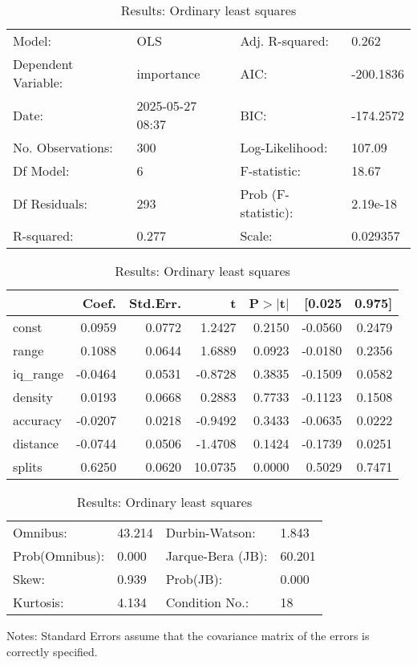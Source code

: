 \begin{table}
\caption{Results: Ordinary least squares}
\label{}
\begin{center}
\begin{tabular}{llll}
\hline
Model:              & OLS              & Adj. R-squared:     & 0.262      \\
Dependent Variable: & importance       & AIC:                & -200.1836  \\
Date:               & 2025-05-27 08:37 & BIC:                & -174.2572  \\
No. Observations:   & 300              & Log-Likelihood:     & 107.09     \\
Df Model:           & 6                & F-statistic:        & 18.67      \\
Df Residuals:       & 293              & Prob (F-statistic): & 2.19e-18   \\
R-squared:          & 0.277            & Scale:              & 0.029357   \\
\hline
\end{tabular}
\end{center}

\begin{center}
\begin{tabular}{lrrrrrr}
\hline
          &   Coef. & Std.Err. &       t & P$> |$t$|$ &  [0.025 & 0.975]  \\
\hline
const     &  0.0959 &   0.0772 &  1.2427 &      0.2150 & -0.0560 & 0.2479  \\
range     &  0.1088 &   0.0644 &  1.6889 &      0.0923 & -0.0180 & 0.2356  \\
iq\_range & -0.0464 &   0.0531 & -0.8728 &      0.3835 & -0.1509 & 0.0582  \\
density   &  0.0193 &   0.0668 &  0.2883 &      0.7733 & -0.1123 & 0.1508  \\
accuracy  & -0.0207 &   0.0218 & -0.9492 &      0.3433 & -0.0635 & 0.0222  \\
distance  & -0.0744 &   0.0506 & -1.4708 &      0.1424 & -0.1739 & 0.0251  \\
splits    &  0.6250 &   0.0620 & 10.0735 &      0.0000 &  0.5029 & 0.7471  \\
\hline
\end{tabular}
\end{center}

\begin{center}
\begin{tabular}{llll}
\hline
Omnibus:       & 43.214 & Durbin-Watson:    & 1.843   \\
Prob(Omnibus): & 0.000  & Jarque-Bera (JB): & 60.201  \\
Skew:          & 0.939  & Prob(JB):         & 0.000   \\
Kurtosis:      & 4.134  & Condition No.:    & 18      \\
\hline
\end{tabular}
\end{center}
\end{table}
\bigskip
Notes: \newline 
[1] Standard Errors assume that the covariance matrix of the errors is correctly specified.